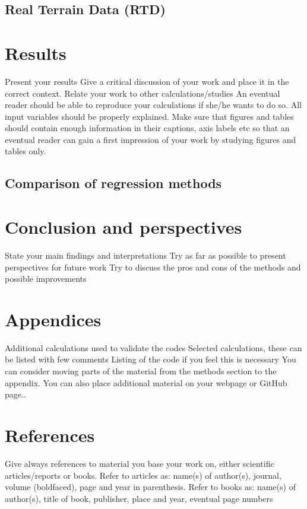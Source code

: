 \documentclass[12pt]{article}
\begin{document}
\begin{multicols}{2}

\subsection{Real Terrain Data (RTD)}

\section{Results}
Present your results
Give a critical discussion of your work and place it in the correct context.
Relate your work to other calculations/studies
An eventual reader should be able to reproduce your calculations if she/he wants to do so. All input variables should be properly explained.
Make sure that figures and tables should contain enough information in their captions, axis labels etc so that an eventual reader can gain a first impression of your work by studying figures and tables only.

\subsection{Comparison of regression methods}

\section{Conclusion and perspectives}
State your main findings and interpretations
Try as far as possible to present perspectives for future work
Try to discuss the pros and cons of the methods and possible improvements

\section{Appendices}
Additional calculations used to validate the codes
Selected calculations, these can be listed with few comments
Listing of the code if you feel this is necessary
You can consider moving parts of the material from the methods section to the appendix. You can also place additional material on your webpage or GitHub page..

\section{References}
Give always references to material you base your work on, either scientific articles/reports or books.
Refer to articles as: name(s) of author(s), journal, volume (boldfaced), page and year in parenthesis.
Refer to books as: name(s) of author(s), title of book, publisher, place and year, eventual page numbers



\end{multicols}
\end{document}
